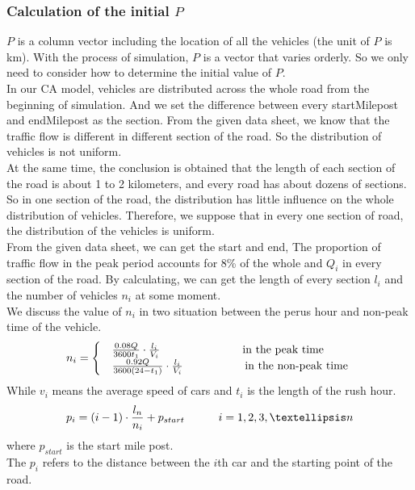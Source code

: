 \documentclass{mcmthesis}
\begin{document}
\subsubsection{Calculation of the initial $P$}
\indent $P$ is a column vector including the location of all the vehicles (the unit of $P$ is km). With the process of simulation, $P$ is a vector that varies orderly. So we only need to consider how to determine the initial value of $P$.\\
\indent In our CA model, vehicles are distributed across the whole road from the beginning of simulation. And we set the difference between every startMilepost and endMilepost as the section. From the given data sheet, we know that the traffic flow is different in different section of the road. So the distribution of vehicles is not uniform.\\
\indent At the same time, the conclusion is obtained that the length of each section of the road is about 1 to 2 kilometers, and every road has about dozens of sections. So in one section of the road, the distribution has little influence on the whole distribution of vehicles. Therefore, we suppose that in every one section of road, the distribution of the vehicles is uniform. \\
\indent From the given data sheet, we can get the start and end, The proportion of traffic flow in the peak period accounts for 8\% of the whole and $Q_{i}$ in every section of the road. By calculating, we can get the length of every section $l_{i}$ and the number of vehicles $n_{i}$ at some moment.\\
\indent We discuss the value of $n_{i}$ in two situation between the perus hour and non-peak time of the vehicle. 
\begin{equation}
	n_{i}=\begin{cases}
	&\frac{0.08Q}{3600t_{1}}\cdot\frac{l_{i}}{V_{i}} \indent\indent\indent \indent\quad\text{\,\,in the peak time }\\ 
	&\frac{0.92Q}{3600(24-t_{1})}\cdot\frac{l_{i}}{V_{i}}\indent\indent\indent \quad\text{in the non-peak time } 
	\end{cases}
\end{equation}
\indent While $v_{i}$ means the average speed of cars and $t_{i}$ is the length of the rush hour.\\
\begin{equation}
	p_i=(i-1)\cdot\frac{l_{n}}{n_{i}}+p_{start} \indent \indent	i=1,2,3,…n
\end{equation}
where $p_{start}$ is the start mile post.\\
\indent The $p_{i}$ refers to the distance between the $i$th car and the starting point of the road.
\end{document}
